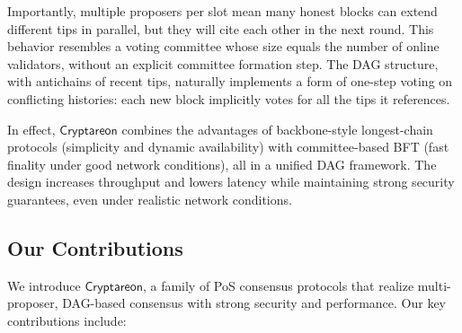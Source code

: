\documentclass[11pt]{article}
\newcommand{\Proj}{\ensuremath{\mathsf{Cryptareon}}\xspace}
\begin{document}
Importantly, multiple proposers per slot mean many honest blocks can extend different tips in parallel, but they will cite each other in the next round. This behavior resembles a voting committee whose size equals the number of online validators, without an explicit committee formation step. The DAG structure, with antichains of recent tips, naturally implements a form of one-step voting on conflicting histories: each new block implicitly votes for all the tips it references.

In effect, \Proj combines the advantages of backbone-style longest-chain protocols (simplicity and dynamic availability) with committee-based BFT (fast finality under good network conditions), all in a unified DAG framework. The design increases throughput and lowers latency while maintaining strong security guarantees, even under realistic network conditions.

\subsection{Our Contributions}
We introduce \Proj, a family of PoS consensus protocols that realize multi-proposer, DAG-based consensus with strong security and performance. Our key contributions include:
\end{document}
